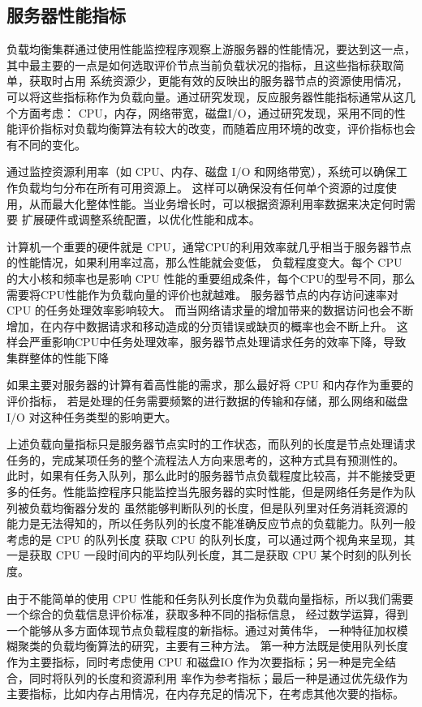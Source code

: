 \subsection{服务器性能指标}

负载均衡集群通过使用性能监控程序观察上游服务器的性能情况，要达到这一点，其中最主要的一点是如何选取评价节点当前负载状况的指标，且这些指标获取简单，获取时占用
系统资源少，更能有效的反映出的服务器节点的资源使用情况，可以将这些指标称作为负载向量。通过研究发现，反应服务器性能指标通常从这几个方面考虑：
CPU，内存，网络带宽，磁盘I/O，通过研究发现，采用不同的性能评价指标对负载均衡算法有较大的改变，而随着应用环境的改变，评价指标也会有不同的变化。

通过监控资源利用率（如 CPU、内存、磁盘 I/O 和网络带宽），系统可以确保工作负载均匀分布在所有可用资源上。
这样可以确保没有任何单个资源的过度使用，从而最大化整体性能。当业务增长时，可以根据资源利用率数据来决定何时需要
扩展硬件或调整系统配置，以优化性能和成本。

计算机一个重要的硬件就是 CPU，通常CPU的利用效率就几乎相当于服务器节点的性能情况，如果利用率过高，那么性能就会变低，
负载程度变大。每个 CPU 的大小核和频率也是影响 CPU 性能的重要组成条件，每个CPU的型号不同，那么需要将CPU性能作为负载向量的评价也就越难。
服务器节点的内存访问速率对 CPU 的任务处理效率影响较大。
而当网络请求量的增加带来的数据访问也会不断增加，在内存中数据请求和移动造成的分页错误或缺页的概率也会不断上升。
这样会严重影响CPU中任务处理效率，服务器节点处理请求任务的效率下降，导致集群整体的性能下降

如果主要对服务器的计算有着高性能的需求，那么最好将 CPU 和内存作为重要的评价指标，
若是处理的任务需要频繁的进行数据的传输和存储，那么网络和磁盘 I/O 对这种任务类型的影响更大。

上述负载向量指标只是服务器节点实时的工作状态\cite{mahato2017scheduling}，而队列的长度是节点处理请求任务的，完成某项任务的整个流程法人方向来思考的，这种方式具有预测性的。
此时，如果有任务入队列，那么此时的服务器节点负载程度比较高，并不能接受更多的任务。性能监控程序只能监控当先服务器的实时性能，但是网络任务是作为队列被负载均衡器分发的
虽然能够判断队列的长度，但是队列里对任务消耗资源的能力是无法得知的，所以任务队列的长度不能准确反应节点的负载能力。队列一般考虑的是 CPU 的队列长度
获取 CPU 的队列长度，可以通过两个视角来呈现，其一是获取 CPU 一段时间内的平均队列长度，其二是获取 CPU 某个时刻的队列长度。

由于不能简单的使用 CPU 性能和任务队列长度作为负载向量指标，所以我们需要一个综合的负载信息评价标准，获取多种不同的指标信息，
经过数学运算，得到一个能够从多方面体现节点负载程度的新指标。通过对黄伟华，
一种特征加权模糊聚类的负载均衡算法\cite{黄伟华2017一种特征加权模糊聚类的负载均衡算法}的研究，主要有三种方法。
第一种方法既是使用队列长度作为主要指标，同时考虑使用 CPU 和磁盘IO 作为次要指标；另一种是完全结合，同时将队列的长度和资源利用
率作为参考指标；最后一种是通过优先级作为主要指标，比如内存占用情况，在内存充足的情况下，在考虑其他次要的指标。

